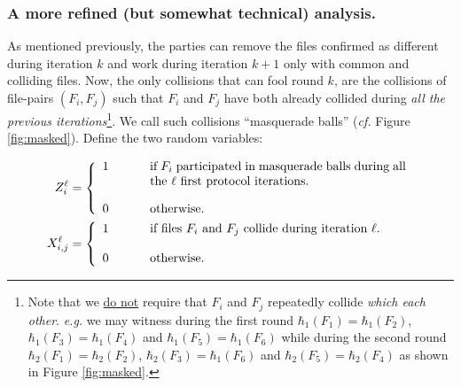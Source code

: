 \documentclass[11pt]{llncs}
\begin{document}
\subsubsection{A more refined (but somewhat technical) analysis.} As mentioned previously, the parties can remove the files confirmed as different during iteration $k$ and work during iteration $k+1$ only with common and colliding files. Now, the only collisions that can fool round $k$, are the collisions of file-pairs $(F_i,F_j)$ such that $F_i$ and $F_j$ have both already collided during {\sl all the previous iterations}\footnote{Note that we \underline{do not} require that $F_i$ and $F_j$ repeatedly collide {\sl which each other}. {\sl e.g.} we may witness during the first round $\hbar_{1}(F_1)=\hbar_{1}(F_2)$, $\hbar_{1}(F_3)=\hbar_{1}(F_4)$ and $\hbar_{1}(F_5)=\hbar_{1}(F_6)$ while during the second round $\hbar_{2}(F_1)=\hbar_2(F_2)$, $\hbar_{2}(F_3)=\hbar_{1}(F_6)$ and $\hbar_{2}(F_5)=\hbar_{2}(F_4)$ as shown in Figure \ref{fig:masked}.}. We call such collisions ``masquerade balls'' ({\sl cf. } Figure \ref{fig:masked}). Define the two random variables:

\begin{align*}
Z^\ell_i &=
\left\{
\begin{array}{lcl}
1 & ~~~~&  \parbox[t]{0.6\textwidth}{if $F_i$ participated in masquerade balls during all the $\ell$ first protocol iterations.}\\
\\
0 & ~~~~&  \mbox{otherwise.}
\end{array}
\right. \\
X^{\ell}_{i,j} &=
\left\{
\begin{array}{lcl}
1 & ~~~~&  \parbox[t]{0.6\textwidth}{if files $F_i$ and $F_j$ collide during iteration $\ell$.}\\
\\
0 & ~~~~&  \mbox{otherwise.}
\end{array}
\right.
\end{align*}

\def\bruijn{file $F_1$,file $F_2$,file $F_3$,file $F_4$,file $F_5$,file $F_6$}
\end{document}
